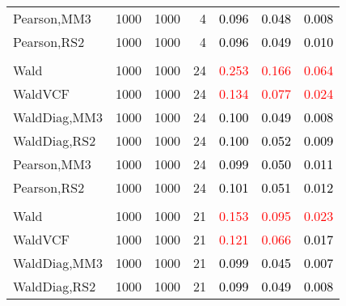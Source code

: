 \documentclass[
]{article}
\begin{document}
\begin{table}[H]
{\begin{tabular}[t]{lrrrrrr}
\hspace{1em}Pearson,MM3 & 1000 & 1000 & 4 & \textcolor{black}{0.096} & \textcolor{black}{0.048} & \textcolor{black}{0.008}\\
\hspace{1em}Pearson,RS2 & 1000 & 1000 & 4 & \textcolor{black}{0.096} & \textcolor{black}{0.049} & \textcolor{black}{0.010}\\
\addlinespace[0.3em]
\multicolumn{7}{l}{\textbf{1F 15V}}\\
\hspace{1em}Wald & 1000 & 1000 & 24 & \textcolor{red}{0.253} & \textcolor{red}{0.166} & \textcolor{red}{0.064}\\
\hspace{1em}WaldVCF & 1000 & 1000 & 24 & \textcolor{red}{0.134} & \textcolor{red}{0.077} & \textcolor{red}{0.024}\\
\hspace{1em}WaldDiag,MM3 & 1000 & 1000 & 24 & \textcolor{black}{0.100} & \textcolor{black}{0.049} & \textcolor{black}{0.008}\\
\hspace{1em}WaldDiag,RS2 & 1000 & 1000 & 24 & \textcolor{black}{0.100} & \textcolor{black}{0.052} & \textcolor{black}{0.009}\\
\hspace{1em}Pearson,MM3 & 1000 & 1000 & 24 & \textcolor{black}{0.099} & \textcolor{black}{0.050} & \textcolor{black}{0.011}\\
\hspace{1em}Pearson,RS2 & 1000 & 1000 & 24 & \textcolor{black}{0.101} & \textcolor{black}{0.051} & \textcolor{black}{0.012}\\
\addlinespace[0.3em]
\multicolumn{7}{l}{\textbf{2F 10V}}\\
\hspace{1em}Wald & 1000 & 1000 & 21 & \textcolor{red}{0.153} & \textcolor{red}{0.095} & \textcolor{red}{0.023}\\
\hspace{1em}WaldVCF & 1000 & 1000 & 21 & \textcolor{red}{0.121} & \textcolor{red}{0.066} & \textcolor{black}{0.017}\\
\hspace{1em}WaldDiag,MM3 & 1000 & 1000 & 21 & \textcolor{black}{0.099} & \textcolor{black}{0.045} & \textcolor{black}{0.007}\\
\hspace{1em}WaldDiag,RS2 & 1000 & 1000 & 21 & \textcolor{black}{0.099} & \textcolor{black}{0.049} & \textcolor{black}{0.008}\\

\end{tabular}}
\end{table}
\end{document}
